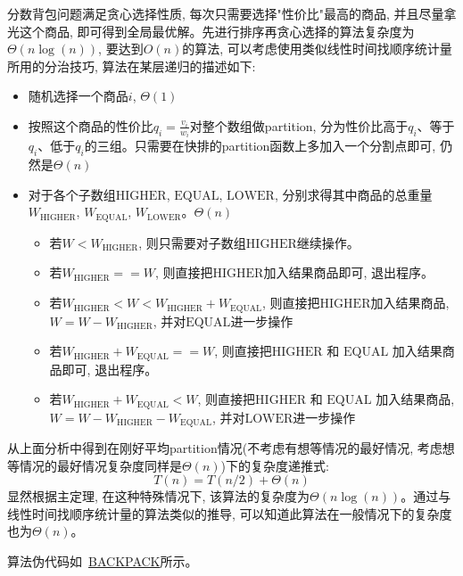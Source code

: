 \documentclass[paper=a4, fontsize=11pt]{scrartcl} %
\numberwithin{equation}{section} %
\numberwithin{figure}{section} %
\numberwithin{table}{section} %
\begin{document}
分数背包问题满足贪心选择性质, 每次只需要选择"性价比"最高的商品, 并且尽量拿光这个商品, 即可得到全局最优解。先进行排序再贪心选择的算法复杂度为$\Theta(n \log(n))$, 要达到$O(n)$的算法, 可以考虑使用类似线性时间找顺序统计量所用的分治技巧, 算法在某层递归的描述如下:
\begin{itemize}
\item 随机选择一个商品$i$, $\Theta(1)$
\item 按照这个商品的性价比$q_i = \frac{v_i}{w_i}$对整个数组做partition, 分为性价比高于$q_i$、等于$q_i$、低于$q_i$的三组。只需要在快排的partition函数上多加入一个分割点即可, 仍然是$\Theta(n)$
\item 对于各个子数组$\mbox{HIGHER}$, $\mbox{EQUAL}$, $\mbox{LOWER}$, 分别求得其中商品的总重量$W_{\mbox{HIGHER}}$, $W_{\mbox{EQUAL}}$, $W_{\mbox{LOWER}}$。$\Theta(n)$
  \begin{itemize}
  \item 若$W < W_{\mbox{HIGHER}}$, 则只需要对子数组$\mbox{HIGHER}$继续操作。
  \item 若$W_{\mbox{HIGHER}} == W $, 则直接把$\mbox{HIGHER}$加入结果商品即可, 退出程序。
  \item 若$W_{\mbox{HIGHER}} < W < W_{\mbox{HIGHER}} + W_{\mbox{EQUAL}}$, 则直接把$\mbox{HIGHER}$加入结果商品, $W = W - W_{\mbox{HIGHER}}$, 并对$\mbox{EQUAL}$进一步操作
  \item 若$W_{\mbox{HIGHER}} + W_{\mbox{EQUAL}} == W $, 则直接把$\mbox{HIGHER}$ 和 $\mbox{EQUAL}$ 加入结果商品即可, 退出程序。
  \item 若$W_{\mbox{HIGHER}} + W_{\mbox{EQUAL}} < W $, 则直接把$\mbox{HIGHER}$ 和 $\mbox{EQUAL}$ 加入结果商品, $W = W - W_{\mbox{HIGHER}} - W_{\mbox{EQUAL}}$, 并对$\mbox{LOWER}$进一步操作
  \end{itemize}
\end{itemize}

从上面分析中得到在刚好平均partition情况(不考虑有想等情况的最好情况, 考虑想等情况的最好情况复杂度同样是$\Theta(n)$)下的复杂度递推式:
\[
T(n) = T(n/2) + \Theta(n)
\]
显然根据主定理, 在这种特殊情况下, 该算法的复杂度为$\Theta(n \log(n))$。通过与线性时间找顺序统计量的算法类似的推导, 可以知道此算法在一般情况下的复杂度也为$\Theta(n)$。

算法伪代码如~\hyperref[algo:backpack]{BACKPACK}所示。
\end{document}
